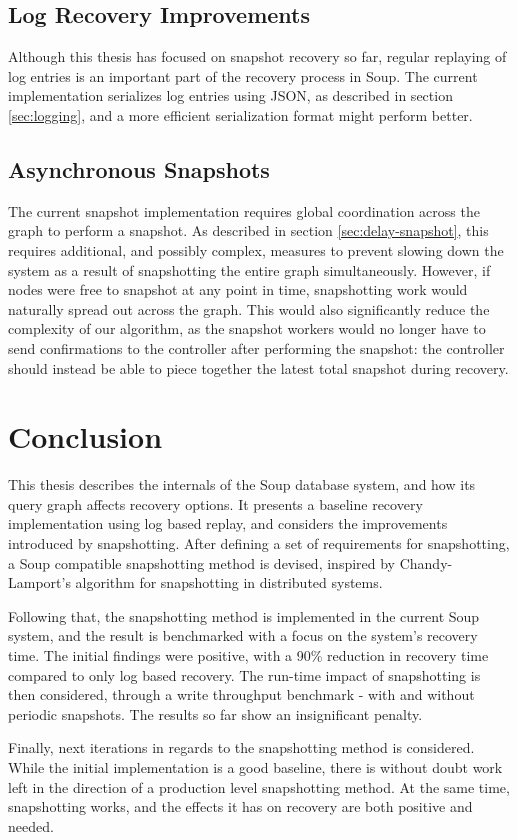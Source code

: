 \documentclass[b5paper]{report}
\begin{document}
\subsection{Log Recovery Improvements}
Although this thesis has focused on snapshot recovery so far, regular replaying
of log entries is an important part of the recovery process in Soup. The current
implementation serializes log entries using JSON, as described in section
\ref{sec:logging}, and a more efficient serialization format might perform
better.

\subsection{Asynchronous Snapshots}
The current snapshot implementation requires global coordination across the
graph to perform a snapshot. As described in section \ref{sec:delay-snapshot},
this requires additional, and possibly complex, measures to prevent slowing down
the system as a result of snapshotting the entire graph simultaneously. However,
if nodes were free to snapshot at any point in time, snapshotting work would
naturally spread out across the graph. This would also significantly reduce the
complexity of our algorithm, as the snapshot workers would no longer have to
send confirmations to the controller after performing the snapshot: the
controller should instead be able to piece together the latest total snapshot
during recovery.

\section{Conclusion}
This thesis describes the internals of the Soup database system, and how its
query graph affects recovery options. It presents a baseline recovery
implementation using log based replay, and considers the improvements introduced
by snapshotting. After defining a set of requirements for snapshotting, a Soup
compatible snapshotting method is devised, inspired by Chandy-Lamport's
algorithm for snapshotting in distributed systems.

Following that, the snapshotting method is implemented in the current Soup
system, and the result is benchmarked with a focus on the system's recovery
time. The initial findings were positive, with a 90\% reduction in recovery
time compared to only log based recovery. The run-time impact of snapshotting is
then considered, through a write throughput benchmark - with and without
periodic snapshots. The results so far show an insignificant penalty.

Finally, next iterations in regards to the snapshotting method is considered.
While the initial implementation is a good baseline, there is without doubt work
left in the direction of a production level snapshotting method. At the same
time, snapshotting works, and the effects it has on recovery are both positive
and needed.



\end{document}
